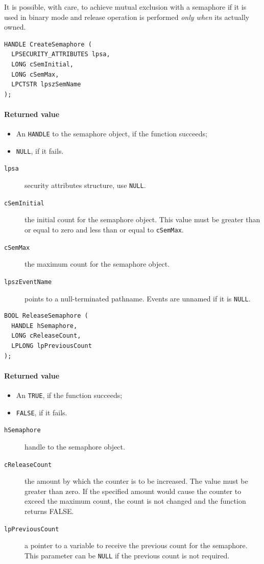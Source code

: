 It is possible, with care, to achieve mutual exclusion with a semaphore if it is used in binary mode and release operation is performed \emph{only when} its actually owned.

\begin{verbatim}
HANDLE CreateSemaphore (
  LPSECURITY_ATTRIBUTES lpsa,
  LONG cSemInitial,
  LONG cSemMax,
  LPCTSTR lpszSemName
);
\end{verbatim}

\paragraph{Returned value}
\begin{itemize}
\item An \texttt{HANDLE} to the semaphore object, if the function succeeds;
\item \texttt{NULL}, if it fails.
\end{itemize}

\begin{description}
\item [\texttt{lpsa}] security attributes structure, use \texttt{NULL}.
\item [\texttt{cSemInitial}] the initial count for the semaphore object. This value must be greater than or equal to zero and less than or equal to \texttt{cSemMax}.
\item [\texttt{cSemMax}] the maximum count for the semaphore object.
\item [\texttt{lpszEventName}] points to a null-terminated pathname. Events are unnamed if it is \texttt{NULL}.
\end{description}

\begin{verbatim}
BOOL ReleaseSemaphore (
  HANDLE hSemaphore,
  LONG cReleaseCount,
  LPLONG lpPreviousCount
);
\end{verbatim}

\paragraph{Returned value}
\begin{itemize}
\item An \texttt{TRUE}, if the function succeeds;
\item \texttt{FALSE}, if it fails.
\end{itemize}

\begin{description}
\item [\texttt{hSemaphore}] handle to the semaphore object.
\item [\texttt{cReleaseCount}] the amount by which the counter is to be increased. The value must be greater than zero. If the specified amount would cause the counter to exceed the maximum count, the count is not changed and the function returns FALSE.
\item [\texttt{lpPreviousCount}] a pointer to a variable to receive the previous count for the semaphore. This parameter can be \texttt{NULL} if the previous count is not required.
\end{description}